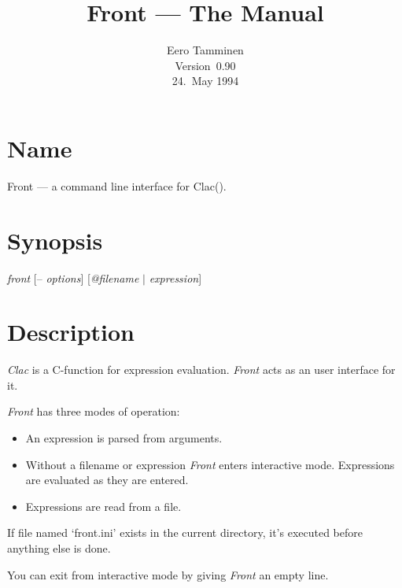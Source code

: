 

\newcommand{\myop}[1]{{\bf #1}}

\title{Front --- The Manual}
\author{Eero Tamminen \\
	Version~0.90 \\
	24.~May 1994}

\pagestyle{myfootings}



\maketitle \makeauthor
\newpage

\section{Name}

	Front --- a command line interface for Clac().


\section{Synopsis}

	{\sl front\/} [-- {\sl options\/}] [{\sl @filename\/} $|$ {\sl expression\/}]


\section{Description}

	{\sl Clac\/} is a C-function for expression evaluation.
	{\sl Front\/} acts as an user interface for it.

	{\sl Front\/} has three modes of operation:
	\begin{itemize}
	\item	An expression is parsed from arguments.
	\item	Without a filename or expression {\sl Front\/} enters
		interactive mode. Expressions are evaluated as
		they are entered.
	\item	Expressions are read from a file.
	\end{itemize}

	If file named `front.ini' exists in the current directory, it's
	executed before anything else is done.

	You can exit from interactive mode by giving {\sl Front\/} an empty
	line.



